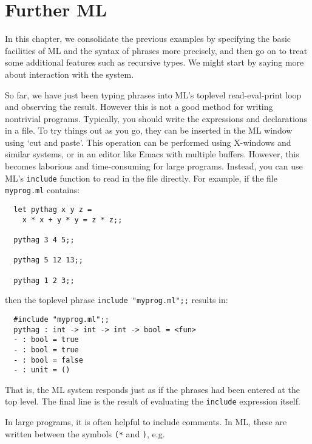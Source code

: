 \chapter{Further ML}

In this chapter, we consolidate the previous examples by specifying the basic
facilities of ML and the syntax of phrases more precisely, and then go on to
treat some additional features such as recursive types. We might start by
saying more about interaction with the system.

So far, we have just been typing phrases into ML's toplevel read-eval-print
loop and observing the result. However this is not a good method for writing
nontrivial programs. Typically, you should write the expressions and
declarations in a file. To try things out as you go, they can be inserted in
the ML window using `cut and paste'. This operation can be performed using
X-windows and similar systems, or in an editor like Emacs with multiple
buffers. However, this becomes laborious and time-consuming for large programs.
Instead, you can use ML's {\tt include} function to read in the file directly.
For example, if the file {\tt myprog.ml} contains:

\begin{boxed}\begin{lstlisting}
  let pythag x y z =
    x * x + y * y = z * z;;

  pythag 3 4 5;;

  pythag 5 12 13;;

  pythag 1 2 3;;
\end{lstlisting}\end{boxed}

\noindent then the toplevel phrase {\tt include "myprog.ml";;} results in:

\begin{boxed}\begin{verbatim}
  #include "myprog.ml";;
  pythag : int -> int -> int -> bool = <fun>
  - : bool = true
  - : bool = true
  - : bool = false
  - : unit = ()
\end{verbatim}\end{boxed}

That is, the ML system responds just as if the phrases had been entered at the
top level. The final line is the result of evaluating the {\tt include}
expression itself.

In large programs, it is often helpful to include comments. In ML, these are
written between the symbols {\tt (*} and {\tt *)}, e.g.

